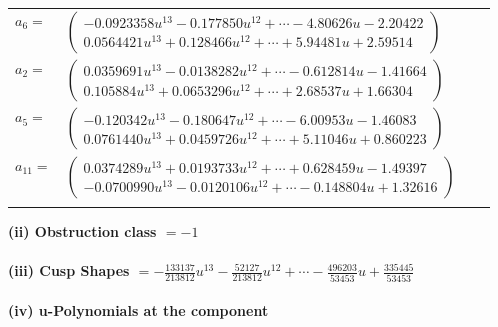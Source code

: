 \documentclass[1p]{elsarticle_modified}
\theoremstyle{definition}
\begin{document}
\begin{tabular}{m{7pt} m{180pt} m{7pt} m{180pt} }
\flushright $a_{6}=$&$\begin{pmatrix}-0.0923358 u^{13}-0.177850 u^{12}+\cdots-4.80626 u-2.20422\\0.0564421 u^{13}+0.128466 u^{12}+\cdots+5.94481 u+2.59514\end{pmatrix}$ \\
\flushright $a_{2}=$&$\begin{pmatrix}0.0359691 u^{13}-0.0138282 u^{12}+\cdots-0.612814 u-1.41664\\0.105884 u^{13}+0.0653296 u^{12}+\cdots+2.68537 u+1.66304\end{pmatrix}$ \\
\flushright $a_{5}=$&$\begin{pmatrix}-0.120342 u^{13}-0.180647 u^{12}+\cdots-6.00953 u-1.46083\\0.0761440 u^{13}+0.0459726 u^{12}+\cdots+5.11046 u+0.860223\end{pmatrix}$ \\
\flushright $a_{11}=$&$\begin{pmatrix}0.0374289 u^{13}+0.0193733 u^{12}+\cdots+0.628459 u-1.49397\\-0.0700990 u^{13}-0.0120106 u^{12}+\cdots-0.148804 u+1.32616\end{pmatrix}$\\&\end{tabular}
\flushleft \textbf{(ii) Obstruction class $= -1$}\\~\\
\flushleft \textbf{(iii) Cusp Shapes $= -\frac{133137}{213812} u^{13}-\frac{52127}{213812} u^{12}+\cdots-\frac{496203}{53453} u+\frac{335445}{53453}$}\\~\\
\newpage\renewcommand{\arraystretch}{1}
\flushleft \textbf{(iv) u-Polynomials at the component}\newline \\
\end{document}

